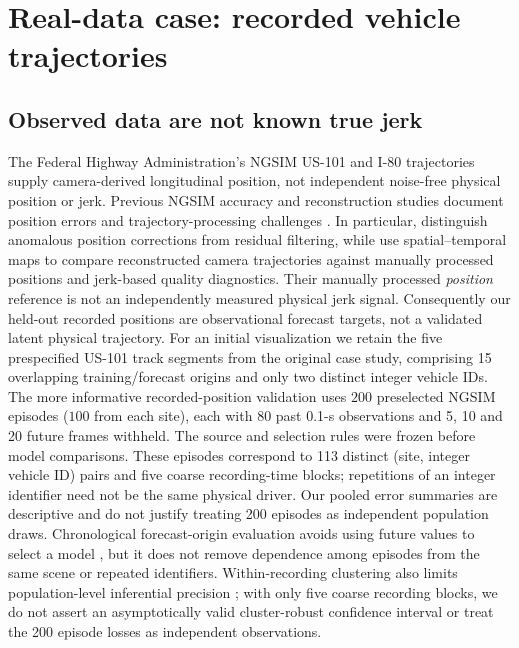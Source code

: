 \section{Real-data case: recorded vehicle trajectories}
\label{sec:real-case}

\subsection{Observed data are not known true jerk}
The Federal Highway Administration's NGSIM US-101 and
I-80 trajectories supply camera-derived longitudinal position,
not independent noise-free physical position or jerk.
Previous NGSIM accuracy and reconstruction studies document
position errors and trajectory-processing challenges
\citep{punzo2011,montanino2013,montanino2015,coifman2017}.
In particular, \citet{montanino2013} distinguish anomalous
position corrections from residual filtering, while
\citet{zhang2024ngsim} use spatial--temporal maps to compare
reconstructed camera trajectories against manually
processed positions and jerk-based quality diagnostics.
Their manually processed \emph{position} reference is
not an independently measured physical jerk signal.
Consequently our held-out recorded positions are observational
forecast targets, not a validated latent physical trajectory.
For an initial visualization we retain the five
prespecified US-101 track segments from the original
case study, comprising 15 overlapping training/forecast
origins and only two distinct integer vehicle IDs.
The more informative recorded-position validation uses
$200$ preselected NGSIM episodes ($100$ from each site),
each with 80 past 0.1-s observations and 5, 10 and
20 future frames withheld. The source and selection
rules were frozen before model comparisons.
These episodes correspond to 113 distinct
(site, integer vehicle ID) pairs and five
coarse recording-time blocks; repetitions
of an integer identifier need not be the same
physical driver. Our pooled error summaries are
descriptive and do not justify treating 200
episodes as independent population draws.
Chronological forecast-origin evaluation avoids using future
values to select a model \citep{tashman2000,cerqueira2020},
but it does not remove dependence among episodes from the
same scene or repeated identifiers. Within-recording clustering
also limits population-level inferential precision
\citep{cameronmiller2015}; with only five coarse recording
blocks, we do not assert an asymptotically valid
cluster-robust confidence interval or treat the 200
episode losses as independent observations.

